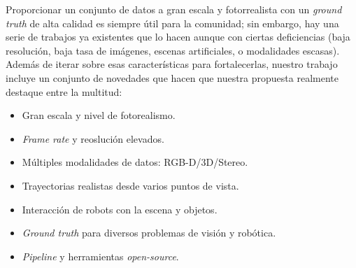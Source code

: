 Proporcionar un conjunto de datos a gran escala y fotorrealista con un \emph{ground truth} de alta calidad es siempre útil para la comunidad; sin embargo, hay una serie de trabajos ya existentes que lo hacen aunque con ciertas deficiencias (baja resolución, baja tasa de imágenes, escenas artificiales, o modalidades escasas). Además de iterar sobre esas características para fortalecerlas, nuestro trabajo incluye un conjunto de novedades que hacen que nuestra propuesta realmente destaque entre la multitud:

\begin{itemize}
    \item Gran escala y nivel de fotorealismo.
    \item \emph{Frame rate} y reoslución elevados.
    \item Múltiples modalidades de datos: RGB-D/3D/Stereo.
	\item Trayectorias realistas desde varios puntos de vista.
	\item Interacción de robots con la escena y objetos.
    \item \emph{Ground truth} para diversos problemas de visión y robótica.
    \item \emph{Pipeline} y herramientas \emph{open-source}.
\end{itemize}